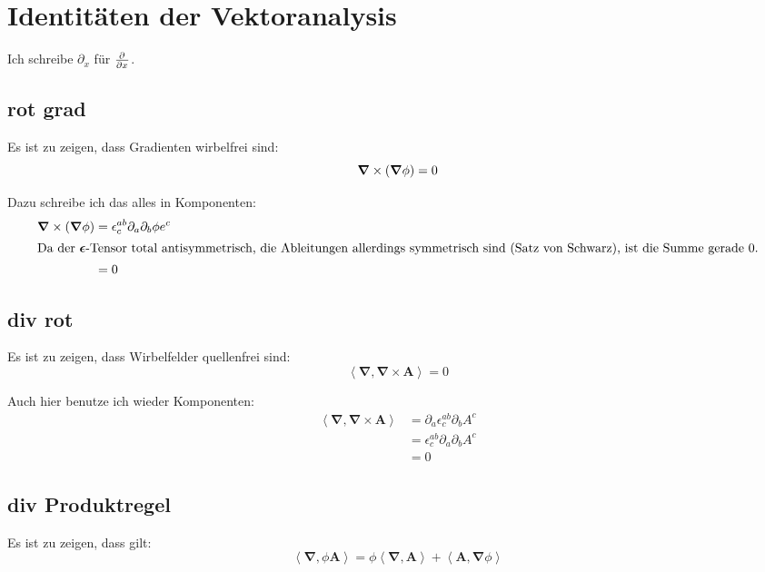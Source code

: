 \documentclass[11pt, ngerman]{article}
\newcommand{\divergence}[1]{\inner{\vnabla}{#1}}
\newcommand{\inner}[2]{\left\langle #1, #2 \right\rangle}
\newcommand{\tens}[1]{\boldsymbol{#1}}
\newcommand{\vnabla}{\vec \nabla}
\renewcommand{\vec}[1]{\boldsymbol{#1}}
\begin{document}

\section{Identitäten der Vektoranalysis}

Ich schreibe $\partial_x$ für $\pd{}x$.

\subsection{rot grad}

Es ist zu zeigen, dass Gradienten wirbelfrei sind:
\[ \vnabla \times \del{\vnabla \phi} = 0 \]

Dazu schreibe ich das alles in Komponenten:
%
\begin{align*}
	\vnabla \times \del{\vnabla \phi} &=
	\epsilon^{ab}_{c} \partial_a \partial_b \phi e^c \\
	\intertext{Da der $\tens \epsilon$-Tensor total antisymmetrisch, die Ableitungen allerdings symmetrisch sind (Satz von Schwarz), ist die Summe gerade 0.}
	&= 0
\end{align*}

\subsection{div rot}

Es ist zu zeigen, dass Wirbelfelder quellenfrei sind:
\[ \divergence{\vnabla \times \vec A} = 0 \]

Auch hier benutze ich wieder Komponenten:
%
\begin{align*}
	\divergence{\vnabla \times \vec A}
	&= \partial_a \epsilon^{ab}_{c} \partial_b A^c \\
	&= \epsilon^{ab}_{c} \partial_a \partial_b A^c \\
	&= 0
\end{align*}

\subsection{div Produktregel}

Es ist zu zeigen, dass gilt:
\[ \divergence{\phi \vec A} = \phi \divergence{\vec A} + \inner{\vec A}{\vnabla \phi} \]
\end{document}
